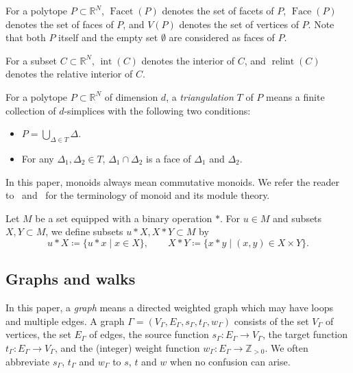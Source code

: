 \documentclass[ALCO,published]{cedram}
\theoremstyle{remark}
\begin{document}
For a polytope $P \subset \mathbb{R}^N$, 
$\operatorname{Facet}(P)$ denotes the set of facets of $P$, 
$\operatorname{Face}(P)$ denotes the set of faces of $P$, and 
$V(P)$ denotes the set of vertices of $P$. 
Note that both $P$ itself and the empty set $\emptyset$ are considered as faces of $P$. 

For a subset $C \subset \mathbb{R}^N$, 
$\operatorname{int}(C)$ denotes the interior of $C$, and 
$\operatorname{relint}(C)$ denotes the relative interior of $C$. 

For a polytope $P \subset \mathbb{R}^N$ of dimension $d$, 
a \textit{triangulation} $T$ of $P$ means a finite collection of $d$-simplices with the following two conditions: 
\begin{itemize}
\item $P = \bigcup _{\Delta \in T} \Delta$. 
\item For any $\Delta _1, \Delta _2 \in T$, $\Delta _1 \cap \Delta _2$ is a face of $\Delta _1$ and $\Delta _2$. 
\end{itemize}

In this paper, monoids always mean commutative monoids. 
We refer the reader to~\cite{BG2009} and~\cite{NSMN21} for the terminology of monoid and its module theory.

Let $M$ be a set equipped with a binary operation $*$. 
For $u \in M$ and subsets $X, Y \subset M$, we define subsets $u * X, X * Y \subset M$ by
\[
u * X \coloneqq  \{ u * x \mid x \in X \}, \qquad
X * Y \coloneqq  \{ x * y \mid (x,y) \in X \times Y \}. 
\]


\subsection{Graphs and walks}\label{subsection:GandW}

In this paper, a \textit{graph} means a directed weighted graph which may have loops and multiple edges. 
A graph $\Gamma = (V_{\Gamma}, E_{\Gamma}, s_{\Gamma}, t_{\Gamma}, w_{\Gamma})$ 
consists of the set $V_{\Gamma}$ of vertices, the set $E_{\Gamma}$ of edges, 
the source function $s_{\Gamma}: E_{\Gamma} \to V_{\Gamma}$, 
the target function $t_{\Gamma}: E_{\Gamma} \to V_{\Gamma}$, and 
the (integer) weight function $w_{\Gamma}: E_{\Gamma} \to \mathbb{Z}_{> 0}$. 
We often abbreviate $s_{\Gamma}$, $t_{\Gamma}$ and $w_{\Gamma}$ to $s$, $t$ and $w$ 
when no confusion can arise. 
\end{document}
